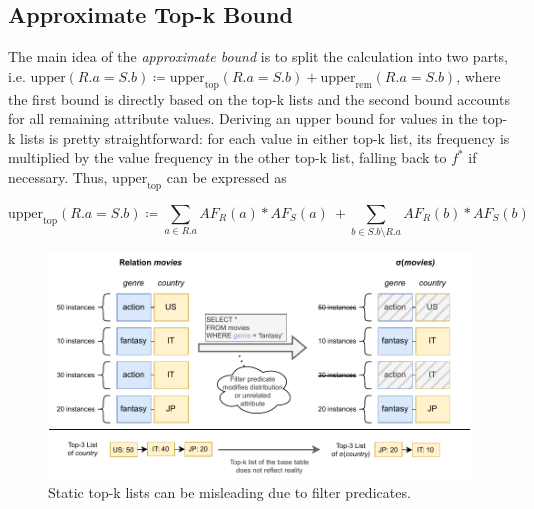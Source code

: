 \subsection{Approximate Top-k Bound}
\label{sec:tighter-bounds-approximate}

The main idea of the \emph{approximate bound} is to split the calculation into two parts, i.e. $\text{upper}(R.a = S.b) \coloneqq \text{upper}_\text{top}(R.a = S.b) + \text{upper}_\text{rem}(R.a = S.b)$, where the first bound is directly based on the top-k lists and the second bound accounts for all remaining attribute values. 
Deriving an upper bound for values in the top-k lists is pretty straightforward: for each value in either top-k list, its frequency is multiplied by the value frequency in the other top-k list, falling back to $f^\ast$ if necessary. 
Thus, $\text{upper}_\text{top}$ can be expressed as

\begin{definition}
    \begin{equation}
        \text{upper}_\text{top}(R.a = S.b) \coloneqq \sum_{a \in R.a} AF_R(a) * AF_S(a)\:+\sum_{b \in S.b \setminus R.a} AF_R(b) * AF_S(b)
    \end{equation}
    \label{def:approx-bound-topk}
\end{definition}

\begin{figure}[tb]
	\centering
	\includegraphics[width=\linewidth]{figures/topk-filters.pdf}
	\caption{Static top-k lists can be misleading due to filter predicates.}
	\label{fig:topk-filter-mismatch}
	\vspace{-0.4cm}
\end{figure}

